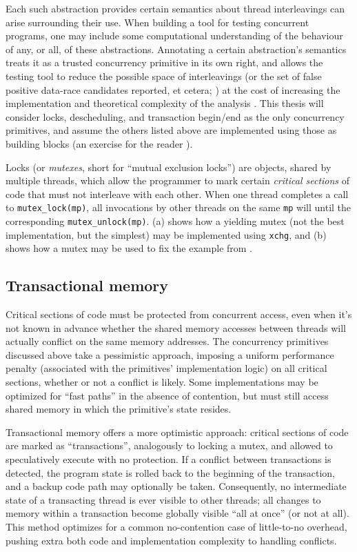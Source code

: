 Each such abstraction provides certain semantics about  thread interleavings can arise surrounding their use.
When building a tool for testing concurrent programs,
one may include some computational understanding of the behaviour of any, or all, of these abstractions.
Annotating a certain abstraction's semantics treats it as a trusted concurrency primitive in its own right,
and allows the testing tool to reduce the possible space of interleavings
(or the set of false positive data-race candidates reported, et cetera;
)
at the cost of increasing the implementation and theoretical complexity of the analysis
.
This thesis will consider locks, descheduling, and transaction begin/end as the only concurrency primitives,
and assume the others listed above are implemented using those as building blocks (an exercise for the reader \cite{thrlib}).

Locks (or {\em mutexes}, short for ``mutual exclusion locks'') are objects, shared by multiple threads, which allow the programmer to mark certain {\em critical sections} of code that must not interleave with each other.
When one thread completes a call to {\tt mutex\_lock(mp)}, all invocations by other threads on the same {\tt mp}
will  until the corresponding {\tt mutex\_unlock(mp)}.
(a) shows how a yielding mutex (not the best implementation, but the simplest) may be implemented using {\tt xchg},
and (b) shows how a mutex may be used to fix the example from .


\subsection{Transactional memory}
\label{sec:overview-tm}

Critical sections of code must be protected from concurrent access, even when it's not known in advance whether the shared memory accesses between threads will actually conflict on the same memory addresses.
The concurrency primitives discussed above take a pessimistic approach, imposing a uniform performance penalty (associated with the primitives' implementation logic) on all critical sections, whether or not a conflict is likely.
Some implementations may be optimized for ``fast paths'' in the absence of contention, but must still access shared memory in which the primitive's state resides.

Transactional memory \cite{transactional-memory} offers a more optimistic approach: critical sections of code are marked as ``transactions'', analogously to locking a mutex, and allowed to speculatively execute with no protection.
If a conflict between transactions is detected, the program state is rolled back to the beginning of the transaction, and a backup code path may optionally be taken.
Consequently, no intermediate state of a transacting thread is ever visible to other threads; all changes to memory within a transaction become globally visible ``all at once'' (or not at all).
This method optimizes for a common no-contention case of little-to-no overhead, pushing extra both code and implementation complexity to handling conflicts.

